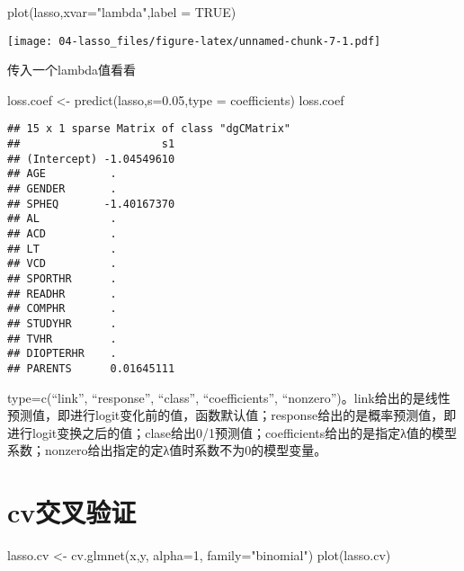 \documentclass[]{ctexbook}
\newenvironment{Shaded}{\begin{snugshade}}{\end{snugshade}}
\newcommand{\AttributeTok}[1]{\textcolor[rgb]{0.77,0.63,0.00}{#1}}
\newcommand{\ConstantTok}[1]{\textcolor[rgb]{0.00,0.00,0.00}{#1}}
\newcommand{\DecValTok}[1]{\textcolor[rgb]{0.00,0.00,0.81}{#1}}
\newcommand{\FloatTok}[1]{\textcolor[rgb]{0.00,0.00,0.81}{#1}}
\newcommand{\FunctionTok}[1]{\textcolor[rgb]{0.00,0.00,0.00}{#1}}
\newcommand{\NormalTok}[1]{#1}
\newcommand{\OtherTok}[1]{\textcolor[rgb]{0.56,0.35,0.01}{#1}}
\newcommand{\StringTok}[1]{\textcolor[rgb]{0.31,0.60,0.02}{#1}}
\begin{document}
\begin{Shaded}
\begin{Highlighting}[]
\FunctionTok{plot}\NormalTok{(lasso,}\AttributeTok{xvar=}\StringTok{"lambda"}\NormalTok{,}\AttributeTok{label =} \ConstantTok{TRUE}\NormalTok{)}
\end{Highlighting}
\end{Shaded}

\texttt{[image: 04-lasso\_files/figure-latex/unnamed-chunk-7-1.pdf]}

传入一个lambda值看看

\begin{Shaded}
\begin{Highlighting}[]
\NormalTok{loss.coef }\OtherTok{\textless{}{-}} \FunctionTok{predict}\NormalTok{(lasso,}\AttributeTok{s=}\FloatTok{0.05}\NormalTok{,}\AttributeTok{type =} \StringTok{\textquotesingle{}coefficients\textquotesingle{}}\NormalTok{)}
\NormalTok{loss.coef}
\end{Highlighting}
\end{Shaded}

\begin{verbatim}
## 15 x 1 sparse Matrix of class "dgCMatrix"
##                      s1
## (Intercept) -1.04549610
## AGE          .         
## GENDER       .         
## SPHEQ       -1.40167370
## AL           .         
## ACD          .         
## LT           .         
## VCD          .         
## SPORTHR      .         
## READHR       .         
## COMPHR       .         
## STUDYHR      .         
## TVHR         .         
## DIOPTERHR    .         
## PARENTS      0.01645111
\end{verbatim}

type=c(``link'', ``response'', ``class'', ``coefficients'', ``nonzero'')。link给出的是线性预测值，即进行logit变化前的值，函数默认值；response给出的是概率预测值，即进行logit变换之后的值；clase给出0/1预测值；coefficients给出的是指定λ值的模型系数；nonzero给出指定的定λ值时系数不为0的模型变量。

\hypertarget{cvux4ea4ux53c9ux9a8cux8bc1}{%
\section{cv交叉验证}\label{cvux4ea4ux53c9ux9a8cux8bc1}}

\begin{Shaded}
\begin{Highlighting}[]
\NormalTok{lasso.cv }\OtherTok{\textless{}{-}} \FunctionTok{cv.glmnet}\NormalTok{(x,y, }\AttributeTok{alpha=}\DecValTok{1}\NormalTok{,  }\AttributeTok{family=}\StringTok{"binomial"}\NormalTok{)}
\FunctionTok{plot}\NormalTok{(lasso.cv)}
\end{Highlighting}
\end{Shaded}
\end{document}

